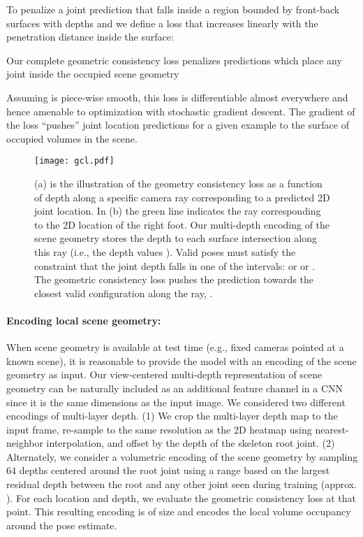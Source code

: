 \documentclass[times,referee,twocolumn,final,authoryear]{elsarticle}
\begin{document}
To penalize a joint prediction  that falls inside a region bounded by
front-back surfaces with depths  and  we define a loss that
increases linearly with the penetration distance inside the surface:

Our complete geometric consistency loss penalizes predictions which place 
any joint inside the occupied scene geometry

Assuming  is piece-wise smooth, this loss is differentiable almost
everywhere and hence amenable to optimization with stochastic gradient descent. 
The gradient of the loss ``pushes'' joint location predictions for a given example 
to the surface of occupied volumes in the scene.

\begin{figure}[t]
\begin{center}
\texttt{[image: gcl.pdf]}
\end{center}
   \caption{(a) is the illustration of the geometry consistency loss as a function of
   depth along a specific camera ray corresponding to a predicted 2D joint
   location.  In (b) the green line indicates the ray corresponding to the 2D
   location of the right foot. Our multi-depth encoding of the scene geometry
   stores the depth to each surface intersection along this ray (i.e., the
   depth values ). Valid poses must satisfy the constraint
   that the joint depth falls in one of the intervals:   or  or . The geometric consistency loss pushes the
   prediction  towards the closest valid configuration along the ray,  .}
\label{fig:constraint}
\end{figure}

\paragraph{Encoding local scene geometry:}
When scene geometry is available at test time (e.g., fixed cameras pointed at a
known scene), it is reasonable to provide the model with an encoding of the
scene geometry as input. Our view-centered multi-depth representation of scene 
geometry can be naturally included as an additional feature channel in a CNN
since it is the same dimensions as the input image. 
We considered two different encodings of multi-layer depth. (1) We crop the
multi-layer depth map to the input frame, re-sample to the same resolution as the 2D
heatmap using nearest-neighbor interpolation, and offset by the depth of the
skeleton root joint.  (2) Alternately, we consider a volumetric encoding of the 
scene geometry by sampling 64 depths centered around the root joint using a range 
based on the largest residual depth between the root and any other joint seen during 
training (approx. ). For each  location and depth, we evaluate the 
geometric consistency loss  at that point. This resulting encoding is
of size  and encodes the local volume occupancy around
the pose estimate. 
\end{document}
